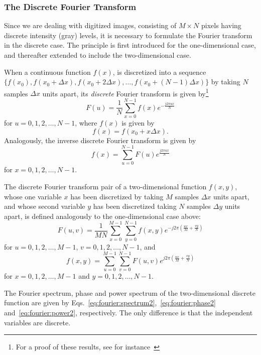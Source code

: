 \subsubsection{The Discrete Fourier Transform}

Since we are dealing with digitized images, consisting of $M\times N$
pixels having discrete intensity (gray) levels, it is necessary to
formulate the Fourier transform in the discrete case.  The principle
is first introduced for the one-dimensional case, and thereafter
extended to include the two-dimensional case.

When a continuous function $f(x)$, is discretized into a sequence
$\{f(x_{0}),f(x_{0}+\Delta x),f(x_{0}+2\Delta x),\ldots,
f(x_{0}+(N-1)\Delta x)\}$ by taking $N$ samples $\Delta x$ units
apart, its {\em discrete\/} Fourier transform is given by\footnote{For
  a proof of these results, see for instance~\cite{brigham}}
\begin{equation}
\label{eq:fourier:discrete}
  F(u)=\frac{1}{N}\sum_{x=0}^{N-1}f(x)e^{-\frac{j2\pi ux}{N}}
\end{equation}
for $u=0,1,2,\ldots,N-1$, where $f(x)$ is given by
\begin{equation}
  f(x)=f(x_{0}+x\Delta x)\mbox{.}
\end{equation}
Analogously, the inverse discrete Fourier transform is given by
\begin{equation}
\label{eq:fourier:discrete:inverse}
  f(x)=\sum_{u=0}^{N-1}F(u)e^{\frac{j2\pi ux}{N}}
\end{equation}
for $x=0,1,2,\ldots,N-1$.

The discrete Fourier transform pair of a two-dimensional function
$f(x,y)$, whose one variable $x$ has been discretized by taking $M$
samples $\Delta x$ units apart, and whose second variable $y$ has been
discretized taking $N$ samples $\Delta y$ units apart, is defined
analogously to the one-dimensional case above:
\begin{equation}
  F(u,v)=\frac{1}{MN}\sum_{x=0}^{M-1}\sum_{y=0}^{N-1}f(x,y)e^{-j2\pi
    (\frac{ux}{M}+\frac{vy}{N})} 
\end{equation}
for $u=0,1,2,\ldots,M-1$, $v=0,1,2,\ldots,N-1$, and
\begin{equation}
  f(x,y)=\sum_{u=0}^{M-1}\sum_{v=0}^{N-1}F(u,v)e^{j2\pi
    (\frac{ux}{M}+\frac{vy}{N})} 
\end{equation}
for $x=0,1,2,\ldots,M-1$ and $y=0,1,2,\ldots,N-1$.

The Fourier spectrum, phase and power spectrum of the two-dimensional
discrete function are given by
Eqs.~\ref{eq:fourier:spectrum2},~\ref{eq:fourier:phase2}
and~\ref{eq:fourier:power2}, respectively.  The only difference is
that the independent variables are discrete.

